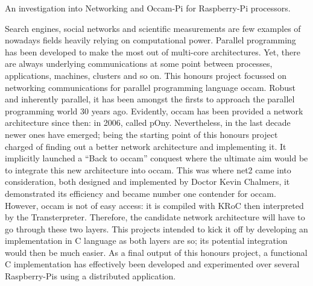 An investigation into Networking and Occam-\/\+Pi for Raspberry-\/\+Pi processors.

Search engines, social networks and scientific measurements are few examples of nowadays fields heavily relying on computational power. Parallel programming has been developed to make the most out of multi-\/core architectures. Yet, there are always underlying communications at some point between processes, applications, machines, clusters and so on. This honours project focussed on networking communications for parallel programming language occam. Robust and inherently parallel, it has been amongst the firsts to approach the parallel programming world 30 years ago. Evidently, occam has been provided a network architecture since then\+: in 2006, called p\+Ony. Nevertheless, in the last decade newer ones have emerged; being the starting point of this honours project charged of finding out a better network architecture and implementing it. It implicitly launched a “\+Back to occam” conquest where the ultimate aim would be to integrate this new architecture into occam. This was where net2 came into consideration, both designed and implemented by Doctor Kevin Chalmers, it demonstrated its efficiency and became number one contender for occam. However, occam is not of easy access\+: it is compiled with K\+Ro\+C then interpreted by the Transterpreter. Therefore, the candidate network architecture will have to go through these two layers. This projects intended to kick it off by developing an implementation in C language as both layers are so; its potential integration would then be much easier. As a final output of this honours project, a functional C implementation has effectively been developed and experimented over several Raspberry-\/\+Pis using a distributed application. 